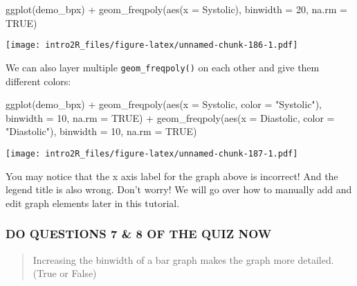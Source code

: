 \documentclass[
]{book}
\newenvironment{Shaded}{\begin{snugshade}}{\end{snugshade}}
\newcommand{\AttributeTok}[1]{\textcolor[rgb]{0.77,0.63,0.00}{#1}}
\newcommand{\ConstantTok}[1]{\textcolor[rgb]{0.00,0.00,0.00}{#1}}
\newcommand{\DecValTok}[1]{\textcolor[rgb]{0.00,0.00,0.81}{#1}}
\newcommand{\FunctionTok}[1]{\textcolor[rgb]{0.00,0.00,0.00}{#1}}
\newcommand{\NormalTok}[1]{#1}
\newcommand{\SpecialCharTok}[1]{\textcolor[rgb]{0.00,0.00,0.00}{#1}}
\newcommand{\StringTok}[1]{\textcolor[rgb]{0.31,0.60,0.02}{#1}}
\begin{document}
\begin{Shaded}
\begin{Highlighting}[]
\FunctionTok{ggplot}\NormalTok{(demo\_bpx) }\SpecialCharTok{+}
    \FunctionTok{geom\_freqpoly}\NormalTok{(}\FunctionTok{aes}\NormalTok{(}\AttributeTok{x =}\NormalTok{ Systolic), }\AttributeTok{binwidth =} \DecValTok{20}\NormalTok{, }\AttributeTok{na.rm =} \ConstantTok{TRUE}\NormalTok{)}
\end{Highlighting}
\end{Shaded}

\texttt{[image: intro2R\_files/figure-latex/unnamed-chunk-186-1.pdf]}

We can also layer multiple \texttt{geom\_freqpoly()} on each other and give them different colors:

\begin{Shaded}
\begin{Highlighting}[]
\FunctionTok{ggplot}\NormalTok{(demo\_bpx) }\SpecialCharTok{+}
    \FunctionTok{geom\_freqpoly}\NormalTok{(}\FunctionTok{aes}\NormalTok{(}\AttributeTok{x =}\NormalTok{ Systolic, }\AttributeTok{color =} \StringTok{"Systolic"}\NormalTok{), }\AttributeTok{binwidth =} \DecValTok{10}\NormalTok{, }\AttributeTok{na.rm =} \ConstantTok{TRUE}\NormalTok{) }\SpecialCharTok{+}
    \FunctionTok{geom\_freqpoly}\NormalTok{(}\FunctionTok{aes}\NormalTok{(}\AttributeTok{x =}\NormalTok{ Diastolic, }\AttributeTok{color =} \StringTok{"Diastolic"}\NormalTok{), }\AttributeTok{binwidth =} \DecValTok{10}\NormalTok{, }\AttributeTok{na.rm =} \ConstantTok{TRUE}\NormalTok{)}
\end{Highlighting}
\end{Shaded}

\texttt{[image: intro2R\_files/figure-latex/unnamed-chunk-187-1.pdf]}

You may notice that the x axis label for the graph above is incorrect! And the legend title is also wrong. Don't worry! We will go over how to manually add and edit graph elements later in this tutorial.

\hypertarget{do-questions-7-8-of-the-quiz-now}{%
\subsubsection{DO QUESTIONS 7 \& 8 OF THE QUIZ NOW}\label{do-questions-7-8-of-the-quiz-now}}

\begin{quote}
Increasing the binwidth of a bar graph makes the graph more detailed. (True or False)
\end{quote}
\end{document}
